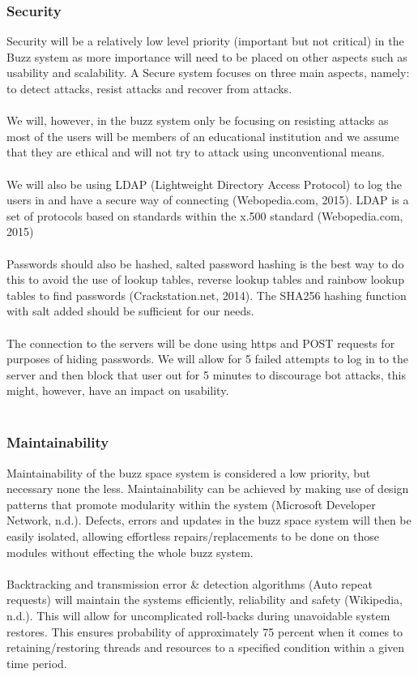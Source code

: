 \subsubsection{Security}
Security will be a relatively low level priority (important but not critical) in the Buzz system as more importance will need to be placed on other aspects such as usability and scalability. A Secure system focuses on three main aspects, namely: to detect attacks, resist attacks and recover from attacks.\\
\\
We will, however, in the buzz system only be focusing on resisting attacks as most of the users will be members of an educational institution and we assume that they are ethical and will not try to attack using unconventional means.\\
\\
We will also be using LDAP (Lightweight Directory Access Protocol) to log the users in and have a secure way of connecting (Webopedia.com, 2015). LDAP is a set of protocols based on standards within the x.500 standard (Webopedia.com, 2015)\\
\\
Passwords should also be hashed, salted password hashing is the best way to do this to avoid the use of lookup tables, reverse lookup tables and rainbow lookup tables to find passwords (Crackstation.net, 2014). The SHA256 hashing function with salt added should be sufficient for our needs.\\
\\
The connection to the servers will be done using https and POST requests for purposes of hiding passwords. We will allow for 5 failed attempts to log in to the server and then block that user out for 5 minutes to discourage bot attacks, this might, however, have an impact on usability.\\
\\
\subsubsection{Maintainability}
Maintainability of the buzz space system is considered a low priority, but necessary none the less. Maintainability can be achieved by making use of design patterns that promote modularity within the system (Microsoft Developer Network, n.d.). Defects, errors and updates in the buzz space system will then be easily isolated, allowing effortless repairs/replacements to be done on those modules without effecting the whole buzz system.\\
\\
Backtracking and transmission error & detection algorithms (Auto repeat requests) will maintain the systems efficiently, reliability and safety (Wikipedia, n.d.). This will allow for uncomplicated roll-backs during unavoidable system restores. This ensures probability of approximately 75 percent when it comes to retaining/restoring threads and resources to a specified condition within a given time period.\\
\\
